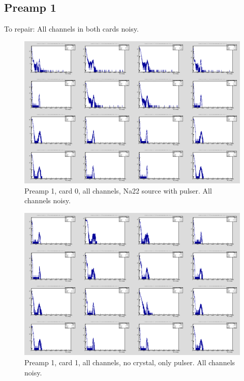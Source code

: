 \documentclass{report}
\begin{document}
\newpage
\clearpage
\subsection{Preamp 1}
To repair: All channels in both cards noisy.
\begin{figure}[!htb]
  \includegraphics[width=\linewidth]{preamp1_lim_energy_card0_all.png}
  \caption{Preamp 1, card 0, all channels, Na22 source  with pulser. All channels noisy.}
\end{figure}

\begin{figure}[!htb]
  \includegraphics[width=\linewidth]{preamp1_lim_energy_card1_all.png}
  \caption{Preamp 1, card 1, all channels, no crystal, only pulser. All channels noisy.}
\end{figure}
\newpage
\clearpage
\end{document}
